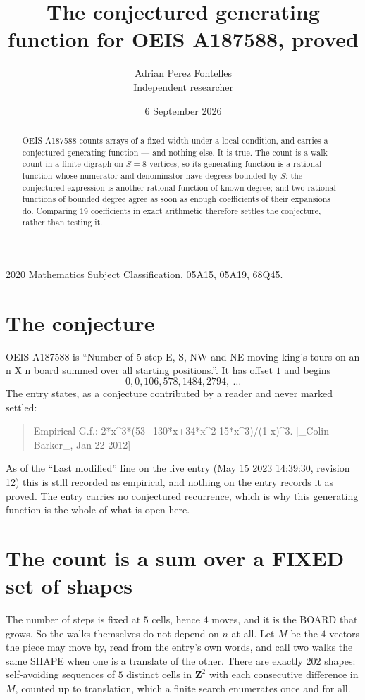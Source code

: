\documentclass[11pt,a4paper]{article}
\title{The conjectured generating function for OEIS A187588, proved}
\author{Adrian Perez Fontelles\\ \small Independent researcher}
\date{6 September 2026}
\theoremstyle{plain}
\theoremstyle{definition}
\begin{document}
\maketitle

\begin{abstract}
OEIS A187588 counts arrays of a fixed width under a local condition, and carries a conjectured
generating function --- and nothing else. It is true. The count is a walk count in a finite
digraph on $S=8$ vertices, so its generating function is a rational function whose numerator
and denominator have degrees bounded by $S$; the conjectured expression is another rational
function of known degree; and two rational functions of bounded degree agree as soon as enough
coefficients of their expansions do. Comparing $19$ coefficients in exact arithmetic
therefore settles the conjecture, rather than testing it.
\end{abstract}

\noindent\small 2020 Mathematics Subject Classification. 05A15, 05A19, 68Q45.\normalsize

\section{The conjecture}

OEIS A187588 is ``Number of 5-step E, S, NW and NE-moving king's tours on an n X n board summed over all starting positions.''. It has offset $1$ and begins
\[
0, 0, 106, 578, 1484, 2794,\ \dots
\]
The entry states, as a conjecture contributed by a reader and never marked settled:
\begin{quote}
Empirical G.f.: 2*x\^{}3*(53+130*x+34*x\^{}2-15*x\^{}3)/(1-x)\^{}3. [\_Colin Barker\_, Jan 22 2012]
\end{quote}
As of the ``Last modified'' line on the live entry (May 15 2023 14:39:30, revision 12) this is still
recorded as empirical, and nothing on the entry records it as proved. The entry carries no
conjectured recurrence, which is why this generating function is the whole of what is open
here.


\section{The count is a sum over a FIXED set of shapes}

The number of steps is fixed at $5$ cells, hence $4$ moves, and it is the BOARD
that grows. So the walks themselves do not depend on $n$ at all. Let $M$ be the $4$
vectors the piece may move by, read from the entry's own words, and call two walks the same
SHAPE when one is a translate of the other. There are exactly $202$ shapes: self-avoiding
sequences of $5$ distinct cells in $\mathbf{Z}^{2}$ with each consecutive difference in
$M$, counted up to translation, which a finite search enumerates once and for all.
\end{document}
